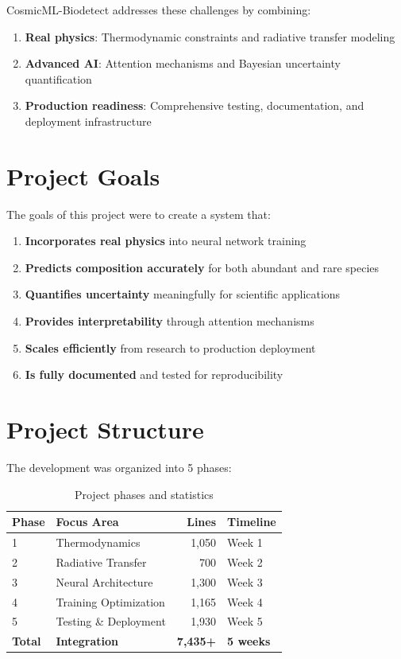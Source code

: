 \documentclass[12pt,a4paper,oneside]{report}
\begin{document}
CosmicML-Biodetect addresses these challenges by combining:
\begin{enumerate}
    \item \textbf{Real physics}: Thermodynamic constraints and radiative transfer modeling
    \item \textbf{Advanced AI}: Attention mechanisms and Bayesian uncertainty quantification
    \item \textbf{Production readiness}: Comprehensive testing, documentation, and deployment infrastructure
\end{enumerate}

\section{Project Goals}

The goals of this project were to create a system that:

\begin{enumerate}
    \item \textbf{Incorporates real physics} into neural network training
    \item \textbf{Predicts composition accurately} for both abundant and rare species
    \item \textbf{Quantifies uncertainty} meaningfully for scientific applications
    \item \textbf{Provides interpretability} through attention mechanisms
    \item \textbf{Scales efficiently} from research to production deployment
    \item \textbf{Is fully documented} and tested for reproducibility
\end{enumerate}

\section{Project Structure}

The development was organized into 5 phases:

\begin{table}[H]
\centering
\begin{tabular}{|l|l|r|l|}
\hline
\textbf{Phase} & \textbf{Focus Area} & \textbf{Lines} & \textbf{Timeline} \\
\hline
1 & Thermodynamics & 1,050 & Week 1 \\
2 & Radiative Transfer & 700 & Week 2 \\
3 & Neural Architecture & 1,300 & Week 3 \\
4 & Training Optimization & 1,165 & Week 4 \\
5 & Testing \& Deployment & 1,930 & Week 5 \\
\hline
\textbf{Total} & \textbf{Integration} & \textbf{7,435+} & \textbf{5 weeks} \\
\hline
\end{tabular}
\caption{Project phases and statistics}
\end{table}
\end{document}
